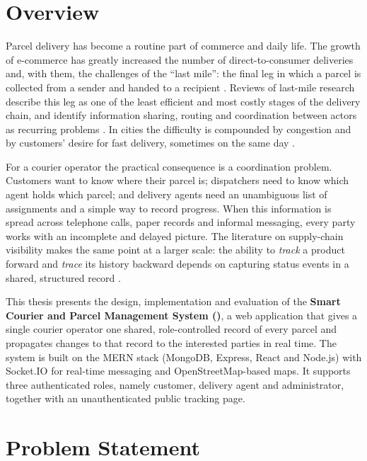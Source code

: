 \section{Overview}
\label{sec:intro-overview}

Parcel delivery has become a routine part of commerce and daily life. The growth of e-commerce has greatly increased the number of direct-to-consumer deliveries and, with them, the challenges of the ``last mile'': the final leg in which a parcel is collected from a sender and handed to a recipient \cite{savelsbergh2016city,boysen2021lastmile}. Reviews of last-mile research describe this leg as one of the least efficient and most costly stages of the delivery chain, and identify information sharing, routing and coordination between actors as recurring problems \cite{boysen2021lastmile,ranieri2018review,olsson2019framework}. In cities the difficulty is compounded by congestion and by customers' desire for fast delivery, sometimes on the same day \cite{savelsbergh2016city}.

For a courier operator the practical consequence is a coordination problem. Customers want to know where their parcel is; dispatchers need to know which agent holds which parcel; and delivery agents need an unambiguous list of assignments and a simple way to record progress. When this information is spread across telephone calls, paper records and informal messaging, every party works with an incomplete and delayed picture. The literature on supply-chain visibility makes the same point at a larger scale: the ability to \emph{track} a product forward and \emph{trace} its history backward depends on capturing status events in a shared, structured record \cite{musa2014visibility}.

This thesis presents the design, implementation and evaluation of the \textbf{Smart Courier and Parcel Management System (\scpms)}, a web application that gives a single courier operator one shared, role-controlled record of every parcel and propagates changes to that record to the interested parties in real time. The system is built on the MERN stack (MongoDB, Express, React and Node.js) with Socket.IO for real-time messaging and OpenStreetMap-based maps. It supports three authenticated roles, namely customer, delivery agent and administrator, together with an unauthenticated public tracking page.

\section{Problem Statement}
\label{sec:problem}

